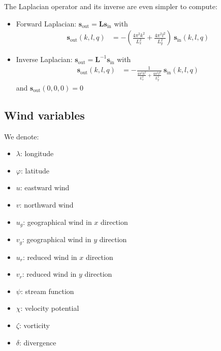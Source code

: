 \documentclass[12pt]{scrartcl}
\begin{document}
The Laplacian operator and its inverse are even simpler to compute:
\begin{itemize}
\item Forward Laplacian: $\mathbf{s}_\text{out} = \mathbf{L} \mathbf{s}_\text{in}$ with
\begin{align}
\mathbf{s}_\text{out}(k,l,q) & = -\left(\frac{4 \pi^2 k^2}{L_x^2}+\frac{4 \pi^2 l^2}{L_y^2}\right) \ \mathbf{s}_\text{in}(k,l,q)
\end{align}
\item Inverse Laplacian: $\mathbf{s}_\text{out} = \mathbf{L}^{-1} \mathbf{s}_\text{in}$ with
\begin{align}
\mathbf{s}_\text{out}(k,l,q) & = -\frac{1}{\displaystyle \frac{4 \pi^2 k^2}{L_x^2}+\frac{4 \pi^2 l^2}{L_y^2}} \ \mathbf{s}_\text{in}(k,l,q)
\end{align}
and $\mathbf{s}_\text{out}(0,0,0) = 0$
\end{itemize}

\subsection{Wind variables}

We denote:
\begin{itemize}
\item $\lambda$: longitude
\item $\varphi$: latitude
\item $u$: eastward wind
\item $v$: northward wind
\item $u_g$: geographical wind in $x$ direction
\item $v_g$: geographical wind in $y$ direction
\item $u_r$: reduced wind in $x$ direction
\item $v_r$: reduced wind in $y$ direction
\item $\psi$: stream function
\item $\chi$: velocity potential
\item $\zeta$: vorticity
\item $\delta$: divergence
\end{itemize}
\end{document}
